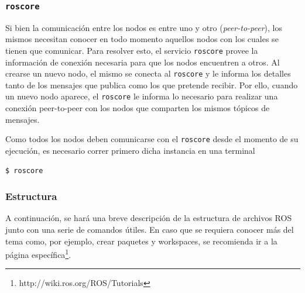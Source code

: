 \subsubsection{\texttt{roscore}}
Si bien la comunicación entre los nodos es entre uno y otro (\textit{peer-to-peer}), los mismos necesitan conocer en todo momento aquellos nodos con los cuales se tienen que comunicar. Para resolver esto, el servicio \texttt{roscore} provee la información de conexión necesaria para que los nodos encuentren a otros. Al crearse un nuevo nodo, el mismo se conecta al \texttt{roscore} y le informa los detalles tanto de los mensajes que publica como los que pretende recibir. Por ello, cuando un nuevo nodo aparece, el \texttt{roscore} le informa lo necesario para realizar una conexión peer-to-peer con los nodos que comparten los mismos tópicos de mensajes.

Como todos los nodos deben comunicarse con el \texttt{roscore} desde el momento de su ejecución, es necesario correr primero dicha instancia en una terminal
\begin{lstlisting}[language=bash]
  $ roscore
\end{lstlisting}

\subsubsection{Estructura}
A continuación, se hará una breve descripción de la estructura de archivos ROS junto con una serie de comandos útiles. En caso que se requiera conocer más del tema como, por ejemplo, crear paquetes y workspaces, se recomienda ir a la página específica\footnote{http://wiki.ros.org/ROS/Tutorials}.

